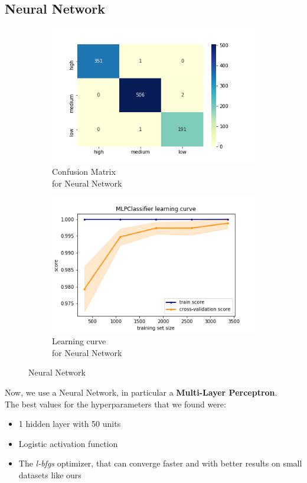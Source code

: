 \subsection{Neural Network}
\begin{figure}[h!]
     \captionsetup{justification=centering}             
     \centering
     \begin{subfigure}{0.49\textwidth}
         \centering
         \captionsetup{type=figure}
         \includegraphics[scale=0.45]{img/classification/nn_confusion.png}
         \caption{Confusion Matrix \\ for Neural Network}
         \label{fig:nn_confusion}
     \end{subfigure}
     \begin{subfigure}{0.49\textwidth}
         \centering
         \includegraphics[scale=0.45]{img/classification/nn_lc.png}
         \caption{Learning curve \\ for Neural Network}
         \label{fig:nn_lc}
     \end{subfigure}
     \caption{Neural Network}
    \label{fig:nn}
\end{figure}
Now, we use a Neural Network, in particular a \textbf{Multi-Layer Perceptron}.\\
The best values for the hyperparameters that we found were:
\begin{itemize}
\item 1 hidden layer with 50 units
\item Logistic activation function
\item The \emph{l-bfgs} optimizer, that can converge faster and with better results on small datasets like ours
\end{itemize}

